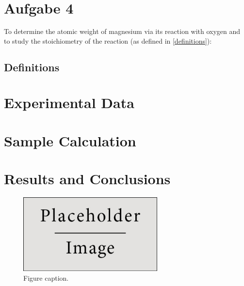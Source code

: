 
\section{Aufgabe 4}

To determine the atomic weight of magnesium via its reaction with oxygen and to study the stoichiometry of the reaction (as defined in \ref{definitions}):



\subsection{Definitions}

 

\section{Experimental Data}



\section{Sample Calculation}


\section{Results and Conclusions}

\begin{figure}[h]
\begin{center}
\includegraphics[width=0.65\textwidth]{imgs/placeholder} %
\caption{Figure caption.}
\end{center}
\end{figure}

